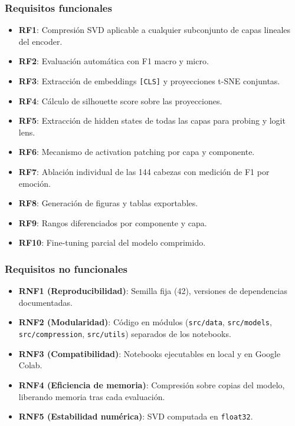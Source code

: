 \subsubsection{Requisitos funcionales}

\begin{itemize}[nosep]
    \item \textbf{RF1}: Compresión SVD aplicable a cualquier subconjunto
    de capas lineales del encoder.
    \item \textbf{RF2}: Evaluación automática con F1 macro y micro.
    \item \textbf{RF3}: Extracción de embeddings \texttt{[CLS]} y
    proyecciones t-SNE conjuntas.
    \item \textbf{RF4}: Cálculo de silhouette score sobre las
    proyecciones.
    \item \textbf{RF5}: Extracción de hidden states de todas las capas
    para probing y logit lens.
    \item \textbf{RF6}: Mecanismo de activation patching por capa y
    componente.
    \item \textbf{RF7}: Ablación individual de las 144 cabezas con
    medición de F1 por emoción.
    \item \textbf{RF8}: Generación de figuras y tablas exportables.
    \item \textbf{RF9}: Rangos diferenciados por componente y capa.
    \item \textbf{RF10}: Fine-tuning parcial del modelo comprimido.
\end{itemize}

\subsubsection{Requisitos no funcionales}

\begin{itemize}[nosep]
    \item \textbf{RNF1 (Reproducibilidad)}: Semilla fija (42),
    versiones de dependencias documentadas.
    \item \textbf{RNF2 (Modularidad)}: Código en módulos (\texttt{src/data},
    \texttt{src/models}, \texttt{src/compression}, \texttt{src/utils})
    separados de los notebooks.
    \item \textbf{RNF3 (Compatibilidad)}: Notebooks ejecutables en local
    y en Google Colab.
    \item \textbf{RNF4 (Eficiencia de memoria)}: Compresión sobre copias
    del modelo, liberando memoria tras cada evaluación.
    \item \textbf{RNF5 (Estabilidad numérica)}: SVD computada en
    \texttt{float32}.
\end{itemize}

